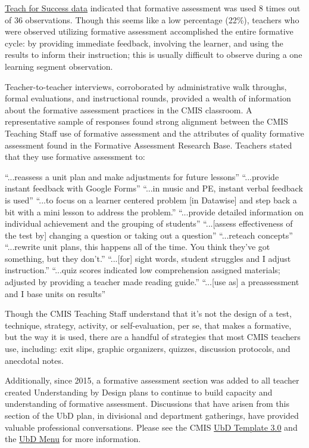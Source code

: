 \begin{findings}
\href{https://docs.google.com/a/cmis.ac.th/document/d/1cRvL50iIDvo8s1Gnxoczm82LhSVmEOvCrFksxzHD7ko/edit?usp=sharing}{Teach for Success data} indicated that formative assessment was used 8 times out of 36 observations. Though this seems like a low percentage (22\%), teachers who were observed utilizing formative assessment accomplished the entire formative cycle: by providing immediate feedback, involving the learner, and using the results to inform their instruction; this is usually difficult to observe during a one learning segment observation. 

Teacher-to-teacher interviews, corroborated by administrative walk throughs, formal evaluations, and instructional rounds, provided a wealth of information about the formative assessment practices in the CMIS classroom. A representative sample of responses found strong alignment between the CMIS Teaching Staff use of formative assessment and the attributes of quality formative assessment found in the Formative Assessment Research Base. Teachers stated that they use formative assessment to:

``...reassess a unit plan and make adjustments for future lessons''
``...provide instant feedback with Google Forms''
``...in music and PE, instant verbal feedback is used'' 
``...to focus on a learner centered problem [in Datawise] and step back a bit with a mini lesson to address the problem.'' 
``...provide detailed information on individual achievement and the grouping of students''
``...[assess effectiveness of the test by] changing a question or taking out a question''
``...reteach concepts''
``...rewrite unit plans, this happens all of the time. You think they’ve got something, but they don’t.'' 
``...[for] sight words, student struggles and I adjust instruction.''
``...quiz scores indicated low comprehension assigned materials; adjusted by providing a teacher made reading guide.''
``...[use as] a preassessment and I base units on results''

Though the CMIS Teaching Staff understand that it’s not the design of a test, technique, strategy, activity, or self-evaluation, per se, that makes a formative, but the way it is used, there are a handful of strategies that most CMIS teachers use, including: exit slips, graphic organizers, quizzes, discussion protocols, and anecdotal notes. 

Additionally, since 2015, a formative assessment section was added to all teacher created Understanding by Design plans to continue to build capacity and understanding of formative assessment. Discussions that have arisen from this section of the UbD plan, in divisional and department gatherings, have provided valuable professional conversations. Please see the CMIS \href{https://docs.google.com/a/cmis.ac.th/document/d/1PsJDkNbtYw-tEd96wM6tFjMWQ2xNZaiwhJAbfQvlNxI/edit?usp=sharing}{UbD Template 3.0} and the \href{https://docs.google.com/a/cmis.ac.th/document/d/1kL1VjwfuMMa7NaWmwUrEah1BM-jJRmLAd4VJzR3HoPs/edit?usp=sharing}{UbD Menu} for more information. 


\end{findings}
